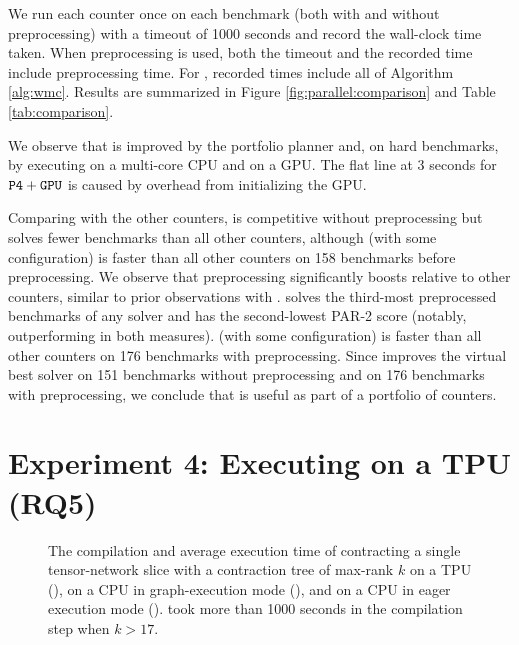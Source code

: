 We run each counter once on each benchmark (both with and without  preprocessing) with a timeout of 1000 seconds and record the wall-clock time taken. When preprocessing is used, both the timeout and the recorded time include preprocessing time. For , recorded times include all of Algorithm \ref{alg:wmc}. Results are summarized in Figure \ref{fig:parallel:comparison} and Table \ref{tab:comparison}. 

We observe that  is improved by the portfolio planner and, on hard benchmarks, by executing on a multi-core CPU and on a GPU. The flat line at 3 seconds for $\texttt{\upshape P4}+\texttt{\upshape GPU}$ is caused by overhead from initializing the GPU.

Comparing  with the other counters,  is competitive without preprocessing but solves fewer benchmarks than all other counters, although  (with some configuration) is faster than all other counters on 158 benchmarks before preprocessing. 
We observe that preprocessing significantly boosts  relative to other counters, similar to prior observations with  \cite{FHZ19}.  solves the third-most preprocessed benchmarks of any solver and has the second-lowest PAR-2 score (notably, outperforming  in both measures).  (with some configuration) is faster than all other counters on 176 benchmarks with preprocessing. Since  improves the virtual best solver on 151 benchmarks without preprocessing and on 176 benchmarks with preprocessing, we conclude that  is useful as part of a portfolio of counters.

\section{Experiment 4: Executing on a TPU (RQ5)}
\label{sec:parallel:exp:tpu}
\begin{figure}[t]
\begin{center}

%
\vspace*{-0.5cm}
\caption{\label{fig:parallel:tpu} The compilation and average execution time of contracting a single tensor-network slice with a contraction tree of max-rank $k$ on a TPU (), on a CPU in graph-execution mode (), and on a CPU in eager execution mode ().  took more than 1000 seconds in the compilation step when $k > 17$.}
\end{center}
\vspace*{-0.8cm}
\end{figure}

